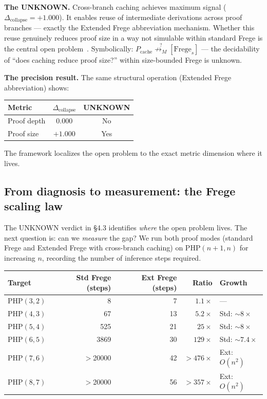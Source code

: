 \documentclass[11pt,a4paper]{article}
\newcommand{\unreachM}{\not\rightarrow_M}     %
\newcommand{\Dcollapse}{\Delta_{\mathrm{collapse}}}
\newcommand{\PHP}{\mathrm{PHP}}
\begin{document}
\textbf{The UNKNOWN.} Cross-branch caching achieves maximum signal ($\Dcollapse = +1.000$). It enables reuse of intermediate derivations across proof branches --- exactly the Extended Frege abbreviation mechanism. Whether this reuse genuinely reduces proof size in a way not simulable within standard Frege is the central open problem~\cite{CookReckhow1979, KrajicekPudlak1989}. Symbolically: $P_{\mathrm{cache}} \stackrel{?}{\unreachM}[\mathrm{Frege}_s]$ --- the decidability of ``does caching reduce proof size?'' within size-bounded Frege is unknown.

\textbf{The precision result.} The same structural operation (Extended Frege abbreviation) shows:
\begin{center}
\begin{tabular}{@{}lcc@{}}
\toprule
Metric & $\Dcollapse$ & UNKNOWN \\
\midrule
Proof depth & $0.000$ & No \\
Proof size & $+1.000$ & Yes \\
\bottomrule
\end{tabular}
\end{center}
The framework localizes the open problem to the exact metric dimension where it lives.

\subsection{From diagnosis to measurement: the Frege scaling law}
\label{sec:scaling}

The UNKNOWN verdict in \S4.3 identifies \emph{where} the open problem lives. The next question is: can we \emph{measure} the gap? We run both proof modes (standard Frege and Extended Frege with cross-branch caching) on $\PHP(n+1, n)$ for increasing $n$, recording the number of inference steps required.

\begin{center}
\begin{tabular}{@{}lrrrl@{}}
\toprule
Target & Std Frege (steps) & Ext Frege (steps) & Ratio & Growth \\
\midrule
$\PHP(3,2)$ & 8 & 7 & $1.1\times$ & --- \\
$\PHP(4,3)$ & 67 & 13 & $5.2\times$ & Std: $\sim 8\times$ \\
$\PHP(5,4)$ & 525 & 21 & $25\times$ & Std: $\sim 8\times$ \\
$\PHP(6,5)$ & 3869 & 30 & $129\times$ & Std: $\sim 7.4\times$ \\
$\PHP(7,6)$ & $>$20000 & 42 & $>476\times$ & Ext: $O(n^2)$ \\
$\PHP(8,7)$ & $>$20000 & 56 & $>357\times$ & Ext: $O(n^2)$ \\
\bottomrule
\end{tabular}
\end{center}
\end{document}
